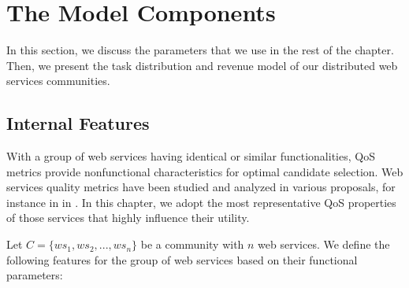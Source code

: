 \section{The Model Components}\label{s:themodelcomponents}

In this section, we discuss the parameters that we use in the rest of the chapter. Then, we present the task distribution and revenue model of our distributed web services communities.

\subsection{Internal Features}\label{s:if}

With a group of web services having identical or similar functionalities, QoS metrics provide nonfunctional characteristics for optimal candidate selection. Web services quality metrics have been studied and analyzed in various proposals, for instance in in \cite{Ardagna:2007:ASC:1263152.1263531,Menasce:2002:QIW:613357.613758,10.1109/ISSRE.2011.17}. In this chapter, we adopt the most representative QoS properties of those services that highly influence their utility.

Let $C = \{ws_1,ws_2,..., ws_n\}$ be a community with $n$ web services. We define the following features for the group of web services based on their functional parameters:

